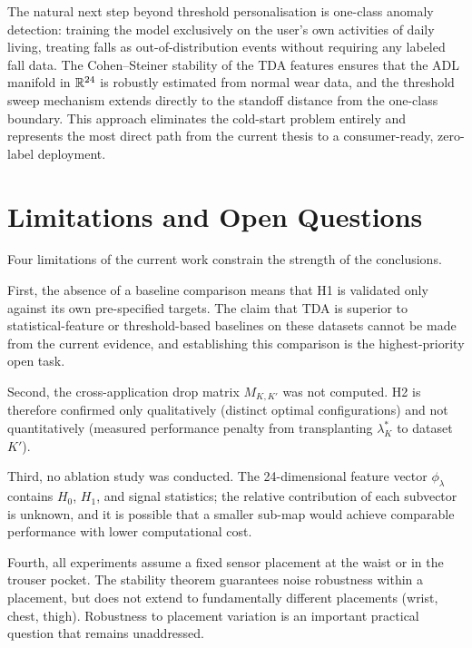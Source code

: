 The natural next step beyond threshold personalisation is one-class anomaly detection:
training the model exclusively on the user's own activities of daily living,
treating falls as out-of-distribution events without requiring any labeled fall data.
The Cohen--Steiner stability of the TDA features ensures that the ADL manifold in
$\mathbb{R}^{24}$ is robustly estimated from normal wear data, and the threshold sweep
mechanism extends directly to the standoff distance from the one-class boundary.
This approach eliminates the cold-start problem entirely and represents the most
direct path from the current thesis to a consumer-ready, zero-label deployment.

\section{Limitations and Open Questions}
\label{subsec:conclusion-limits}

Four limitations of the current work constrain the strength of the conclusions.

First, the absence of a baseline comparison means that H1 is validated only against
its own pre-specified targets.  The claim that TDA is superior to statistical-feature
or threshold-based baselines on these datasets cannot be made from the current
evidence, and establishing this comparison is the highest-priority open task.

Second, the cross-application drop matrix $M_{K,K'}$ was not computed.  H2 is
therefore confirmed only qualitatively (distinct optimal configurations) and not
quantitatively (measured performance penalty from transplanting $\lambda^*_K$ to
dataset $K'$).

Third, no ablation study was conducted.  The 24-dimensional feature vector
$\phi_\lambda$ contains $H_0$, $H_1$, and signal statistics; the relative
contribution of each subvector is unknown, and it is possible that a smaller
sub-map would achieve comparable performance with lower computational cost.

Fourth, all experiments assume a fixed sensor placement at the waist or in the
trouser pocket.  The stability theorem guarantees noise robustness within a
placement, but does not extend to fundamentally different placements (wrist, chest,
thigh).  Robustness to placement variation is an important practical question that
remains unaddressed.

